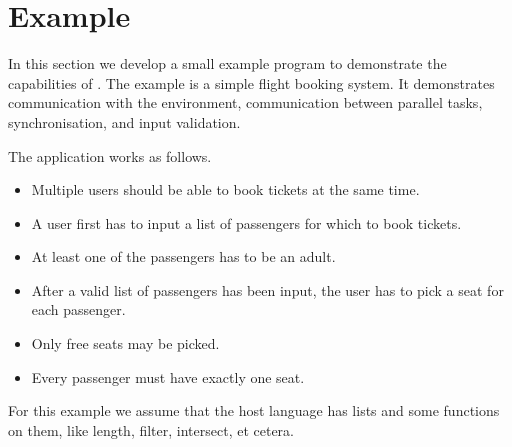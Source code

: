 
\section{Example}

In this section we develop a small example program to demonstrate the capabilities of \TOPHAT.
The example is a simple flight booking system.
It demonstrates communication with the environment, communication between parallel tasks, synchronisation, and input validation.

The application works as follows.
\begin{itemize}
\item Multiple users should be able to book tickets at the same time.
\item A user first has to input a list of passengers for which to book tickets.
\item At least one of the passengers has to be an adult.
\item After a valid list of passengers has been input, the user has to pick a seat for each passenger.
\item Only free seats may be picked.
\item Every passenger must have exactly one seat.
\end{itemize}
For this example we assume that the host language has lists and some functions on them, like length, filter, intersect, et cetera.

